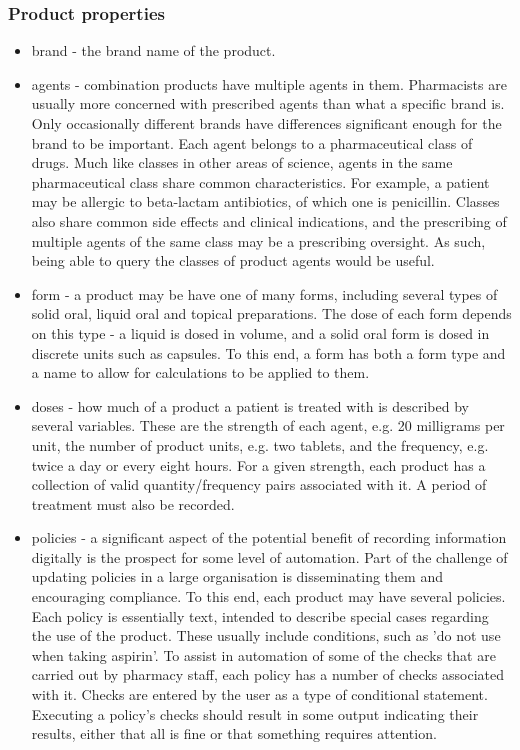 \documentclass[letterpaper]{amsart}
\begin{document}
\subsubsection{Product properties}
\begin{itemize}
    \item brand - the brand name of the product. 
    \item agents - combination products have multiple agents in them.  Pharmacists are usually more concerned with prescribed agents than what a specific brand is.  Only occasionally different brands have differences significant enough for the brand to be important. Each agent belongs to a pharmaceutical class of drugs. Much like classes in other areas of science, agents in the same pharmaceutical class share common characteristics.  For example, a patient may be allergic to beta-lactam antibiotics, of which one is penicillin.
	Classes also share common side effects and clinical indications, and the prescribing of multiple agents of the same class may be a prescribing oversight.  As such, being able to query the classes of product agents would be useful.
    \item form - a product may be have one of many forms, including several types of solid oral, liquid oral and topical preparations.  The dose of each form depends on this type - a liquid is dosed in volume, and a solid oral form is dosed in discrete units such as capsules.  To this end, a form has both a form type and a name to allow for calculations to be applied to them. 
    \item doses - how much of a product a patient is treated with is described by several variables.  These are the strength of each agent, e.g. 20 milligrams per unit, the number of product units, e.g. two tablets, and the frequency, e.g. twice a day or every eight hours.
    For a given strength, each product has a collection of valid quantity/frequency pairs associated with it.  A period of treatment must also be recorded.
    \item policies - a significant aspect of the potential benefit of recording information digitally is the prospect for some level of automation.  Part of the challenge of updating policies in a large organisation is disseminating them and encouraging compliance.  To this end, each product may have several policies.  Each policy is essentially text, intended to describe special cases regarding the use of the product.  These usually include conditions, such as 'do not use when taking aspirin'.  To assist in automation of some of the checks that are carried out by pharmacy staff, each policy has a number of checks associated with it.  Checks are entered by the user as a type of conditional statement.  Executing a policy's checks should result in some output indicating their results, either that all is fine or that something requires attention. 

\end{itemize}
\end{document}
